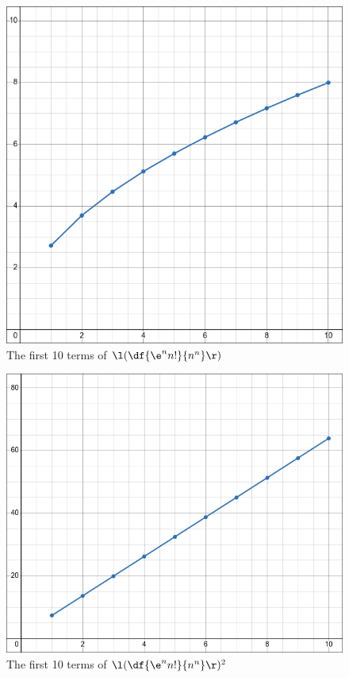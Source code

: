 \documentclass[a4paper]{article}
\begin{document}
\begin{figure}[h]
	\centering
	\includegraphics[scale=0.4]{Q4a}
	\caption{The first 10 terms of $\l(\df{\e^n n!}{n^n}\r)$}
\end{figure}

\begin{figure}[h]
	\centering
	\includegraphics[scale=0.4]{Q4b}
	\caption{The first 10 terms of $\l(\df{\e^n n!}{n^n}\r)^2$}
\end{figure}
\end{document}
